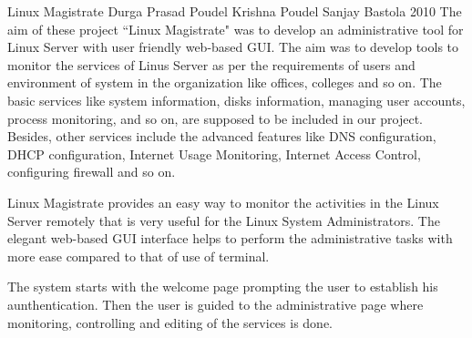 \begin{conf-abstract}[]
{Linux Magistrate}
{ 
Durga Prasad Poudel
Krishna Poudel
Sanjay Bastola
}
{2010}
The aim of these project ``Linux Magistrate" was to develop an administrative tool for Linux Server with user friendly web-based GUI. The aim was to develop tools to monitor the services of Linus Server as per the requirements of users and environment of system in the organization like offices, colleges and so on. The basic services like system information, disks information, managing user accounts, process monitoring, and so on, are supposed to be included in our project. Besides, other services include the advanced features like DNS configuration, DHCP configuration, Internet Usage Monitoring, Internet Access Control, configuring firewall and so on.

Linux Magistrate provides an easy way to monitor the activities in the Linux Server remotely that is very useful for the Linux System Administrators. The elegant web-based GUI interface helps to perform the administrative tasks with more ease compared to that of use of terminal.

The system starts with the welcome page prompting the user to establish his aunthentication. Then the user is guided to the administrative page where monitoring, controlling and editing of the services is done.
\end{conf-abstract}